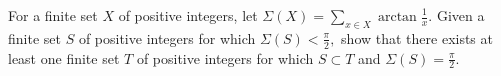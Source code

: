 For a finite set $ X$ of positive integers, let $ \Sigma(X) = \sum_{x \in X} \arctan \frac{1}{x}.$ Given a finite set $ S$ of positive integers for which $ \Sigma(S) < \frac{\pi}{2},$ show that there exists at least one finite set $ T$ of positive integers for which $ S \subset T$ and $ \Sigma(S) = \frac{\pi}{2}$.